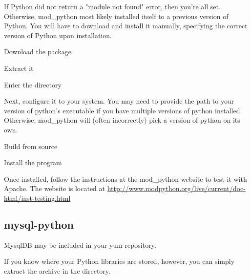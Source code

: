 If Python did not return a "module not found" error, then you're all set.  Otherwise, mod\_python most likely installed itself to a previous version of Python.  You will have to download and install it manually, specifying the correct version of Python upon installation.

Download the package


\vspace{1pc}

Extract it


\vspace{1pc}

Enter the directory


\vspace{1pc}

Next, configure it to your system.  You may need to provide the path to your version of python's executable if you have multiple versions of python installed.  Otherwise, mod\_python will (often incorrectly) pick a version of python on its own.


\vspace{1pc}

Build from source


\vspace{1pc}

Install the program


\vspace{1pc}

Once installed, follow the instructions at the mod\_python website to test it with Apache.  The website is located at \url{http://www.modpython.org/live/current/doc-html/inst-testing.html}

\subsection{mysql-python}
MysqlDB may be included in your yum repository.  

If you know where your Python libraries are stored, however, you can simply extract the archive in the directory.

